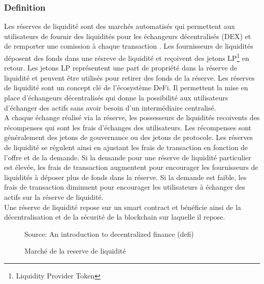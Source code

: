 
\subsubsection{Definition}
Les réserves de liquidité sont des marchés automatisés qui permettent aux utilisateurs de fournir des liquidités pour les échangeurs décentralisés (DEX) et de 
remporter une comission à chaque transaction \cite{jensen2021introduction, belchior2022survey, augustin2022yield}. 
Les fournisseurs de liquidités déposent des fonds dans une résreve de liquidité et reçoivent des jetons 
LP\footnote{Liquidity Provider Token} en retour. Les jetons LP représentent une part de propriété dans la réserve de liquidité et peuvent être utilisés pour 
retirer des fonds de la réserve. Les réserves de liquidité sont un concept clé de l’écosystème DeFi. Il permettent la mise en place d'échangeurs décentralisés 
qui donne la possibilité aux utilisateurs d’échanger des actifs sans avoir besoin d’un intermédiaire centralisé. \\
A chaque échange réalisé via la réserve, les possesseurs de liquidités recoivents des récompenses qui sont les frais d'échanges des utilisateurs. Les récompenses 
sont généralement des jetons de gouvernance ou des jetons de protocole. Les réserves de liquidité se régulent ainsi en ajustant les frais de transaction 
en fonction de l’offre et de la demande. Si la demande pour une réserve de liquidité particulier est élevée, les frais de transaction augmentent pour encourager 
les fournisseurs de liquidités à déposer plus de fonds dans la réserve. Si la demande est faible, les frais de transaction diminuent pour encourager les 
utilisateurs à échanger des actifs sur la réserve de liquidité. \\
Une réserve de liquidité repose sur un smart contract et bénéficie ainsi de la décentralisation et de la sécurité de la blockchain sur laquelle il repose.
\begin{figure}[h!]
    \centering
    {\scriptsize Source: An introduction to decentralized finance (defi) \cite{jensen2021introduction} }
    \caption{Marché de la reserve de liquidité}
    \label{fig:liquidite}
\end{figure}

